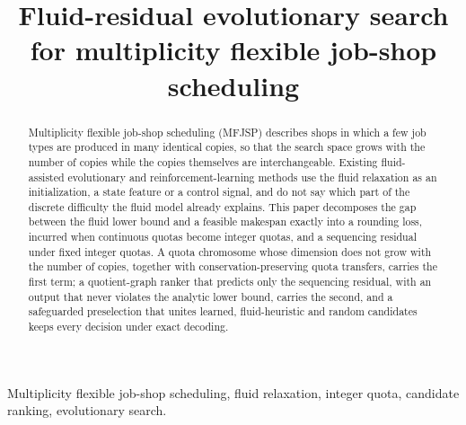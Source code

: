 \documentclass[journal,10pt]{IEEEtran}
\theoremstyle{plain}
\newif\ifanonymous
\begin{document}
\title{Fluid-residual evolutionary search for multiplicity flexible job-shop scheduling}
\ifanonymous
\author{Anonymous authors}
\else
\author{\paperauthors}
\fi
\maketitle
{}
\begin{abstract}
Multiplicity flexible job-shop scheduling (MFJSP) describes shops in which a few job types are produced in many identical
copies, so that the search space grows with the number of copies while the copies themselves are interchangeable.
Existing fluid-assisted evolutionary and reinforcement-learning methods use the fluid relaxation as an initialization, a
state feature or a control signal, and do not say which part of the discrete difficulty the fluid model already explains.
This paper decomposes the gap between the fluid lower bound and a feasible makespan exactly into a rounding loss, incurred
when continuous quotas become integer quotas, and a sequencing residual under fixed integer quotas. A quota chromosome whose
dimension does not grow with the number of copies, together with conservation-preserving quota transfers, carries the first
term; a quotient-graph ranker that predicts only the sequencing residual, with an output that never violates the analytic
lower bound, carries the second, and a safeguarded preselection that unites learned, fluid-heuristic and random candidates
keeps every decision under exact decoding.  
\end{abstract}
\begin{IEEEkeywords}
Multiplicity flexible job-shop scheduling, fluid relaxation, integer quota, candidate ranking, evolutionary search.
\end{IEEEkeywords}









\end{document}
